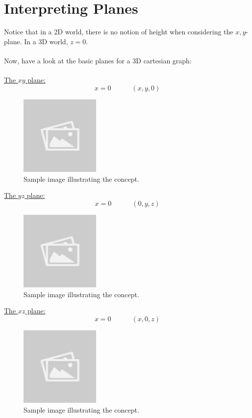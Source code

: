 \documentclass{article}
\begin{document}
\section*{Interpreting Planes}
\begin{conceptbox}
Notice that in a 2D world, there is no notion of height when considering the \( x, y \)-plane. In a 3D world, \( z = 0 \). \\
\\
Now, have a look at the basic planes for a 3D cartesian graph: \\
\\
\underline{The \( xy \) plane:}
\[
    x = 0 \quad\quad\quad (x, y, 0)
\]
\begin{figure}[H]
    \centering
    \includegraphics[width=0.35\textwidth]{sample_image.jpg}
    \caption{Sample image illustrating the concept.}
    \label{fig:sample_image}
\end{figure}
\underline{The \( yz \) plane:}
\[
    x = 0 \quad\quad\quad (0, y, z)
\]
\begin{figure}[H]
    \centering
    \includegraphics[width=0.35\textwidth]{sample_image.jpg}
    \caption{Sample image illustrating the concept.}
    \label{fig:sample_image}
\end{figure}
\underline{The \( xz \) plane:}
\[
    x = 0 \quad\quad\quad (x, 0, z)
\]
\begin{figure}[H]
    \centering
    \includegraphics[width=0.35\textwidth]{sample_image.jpg}
    \caption{Sample image illustrating the concept.}
    \label{fig:sample_image}
\end{figure}
\end{conceptbox}
\end{document}
